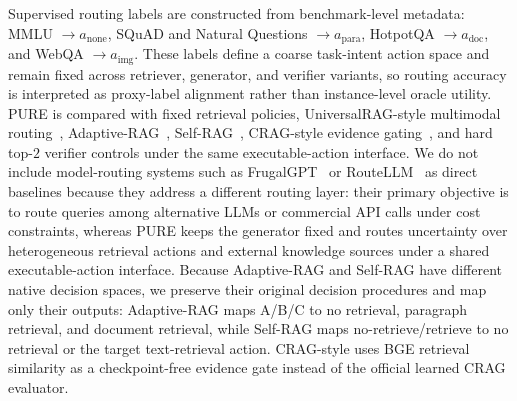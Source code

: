 \documentclass[a4paper,fleqn]{cas-dc}
\begin{document}
Supervised routing labels are constructed from benchmark-level metadata: MMLU $\rightarrow a_{\mathrm{none}}$, SQuAD and Natural Questions $\rightarrow a_{\mathrm{para}}$, HotpotQA $\rightarrow a_{\mathrm{doc}}$, and WebQA $\rightarrow a_{\mathrm{img}}$. These labels define a coarse task-intent action space and remain fixed across retriever, generator, and verifier variants, so routing accuracy is interpreted as proxy-label alignment rather than instance-level oracle utility. PURE is compared with fixed retrieval policies, UniversalRAG-style multimodal routing~\citep{Yeo2026UniversalRAG}, Adaptive-RAG~\citep{Jeong2024AdaptiveRAG}, Self-RAG~\citep{Asai2023SelfRAG}, CRAG-style evidence gating~\citep{Yan2024CorrectiveRAG}, and hard top-$2$ verifier controls under the same executable-action interface. We do not include model-routing systems such as FrugalGPT~\citep{Chen2024FrugalGPT} or RouteLLM~\citep{Ong2025RouteLLM} as direct baselines because they address a different routing layer: their primary objective is to route queries among alternative LLMs or commercial API calls under cost constraints, whereas PURE keeps the generator fixed and routes uncertainty over heterogeneous retrieval actions and external knowledge sources under a shared executable-action interface. Because Adaptive-RAG and Self-RAG have different native decision spaces, we preserve their original decision procedures and map only their outputs: Adaptive-RAG maps A/B/C to no retrieval, paragraph retrieval, and document retrieval, while Self-RAG maps no-retrieve/retrieve to no retrieval or the target text-retrieval action. CRAG-style uses BGE retrieval similarity as a checkpoint-free evidence gate instead of the official learned CRAG evaluator.
\end{document}
